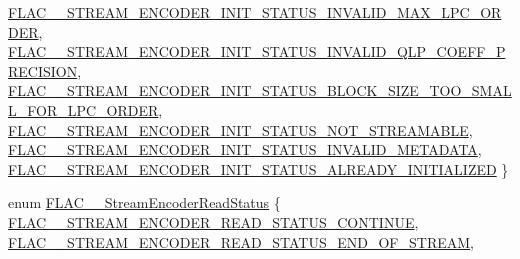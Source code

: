 \begin{DoxyCompactItemize}
\newline
\mbox{\hyperlink{group__flac__stream__encoder_gga3bb869620af2b188d77982a5c30b047da38a69e94b3333e4ba779d2ff8f43f64e}{F\+L\+A\+C\+\_\+\+\_\+\+S\+T\+R\+E\+A\+M\+\_\+\+E\+N\+C\+O\+D\+E\+R\+\_\+\+I\+N\+I\+T\+\_\+\+S\+T\+A\+T\+U\+S\+\_\+\+I\+N\+V\+A\+L\+I\+D\+\_\+\+M\+A\+X\+\_\+\+L\+P\+C\+\_\+\+O\+R\+D\+ER}}, 
\mbox{\hyperlink{group__flac__stream__encoder_gga3bb869620af2b188d77982a5c30b047da5be80403bd7a43450139442e0f34ad7e}{F\+L\+A\+C\+\_\+\+\_\+\+S\+T\+R\+E\+A\+M\+\_\+\+E\+N\+C\+O\+D\+E\+R\+\_\+\+I\+N\+I\+T\+\_\+\+S\+T\+A\+T\+U\+S\+\_\+\+I\+N\+V\+A\+L\+I\+D\+\_\+\+Q\+L\+P\+\_\+\+C\+O\+E\+F\+F\+\_\+\+P\+R\+E\+C\+I\+S\+I\+ON}}, 
\mbox{\hyperlink{group__flac__stream__encoder_gga3bb869620af2b188d77982a5c30b047da62a17a3ed3c05ddf8ea7f6fecbd4e4a1}{F\+L\+A\+C\+\_\+\+\_\+\+S\+T\+R\+E\+A\+M\+\_\+\+E\+N\+C\+O\+D\+E\+R\+\_\+\+I\+N\+I\+T\+\_\+\+S\+T\+A\+T\+U\+S\+\_\+\+B\+L\+O\+C\+K\+\_\+\+S\+I\+Z\+E\+\_\+\+T\+O\+O\+\_\+\+S\+M\+A\+L\+L\+\_\+\+F\+O\+R\+\_\+\+L\+P\+C\+\_\+\+O\+R\+D\+ER}}, 
\mbox{\hyperlink{group__flac__stream__encoder_gga3bb869620af2b188d77982a5c30b047daa793405c858c7606539082750080a47e}{F\+L\+A\+C\+\_\+\+\_\+\+S\+T\+R\+E\+A\+M\+\_\+\+E\+N\+C\+O\+D\+E\+R\+\_\+\+I\+N\+I\+T\+\_\+\+S\+T\+A\+T\+U\+S\+\_\+\+N\+O\+T\+\_\+\+S\+T\+R\+E\+A\+M\+A\+B\+LE}}, 
\newline
\mbox{\hyperlink{group__flac__stream__encoder_gga3bb869620af2b188d77982a5c30b047daa85afdd1849c75a19594416cef63e3e9}{F\+L\+A\+C\+\_\+\+\_\+\+S\+T\+R\+E\+A\+M\+\_\+\+E\+N\+C\+O\+D\+E\+R\+\_\+\+I\+N\+I\+T\+\_\+\+S\+T\+A\+T\+U\+S\+\_\+\+I\+N\+V\+A\+L\+I\+D\+\_\+\+M\+E\+T\+A\+D\+A\+TA}}, 
\mbox{\hyperlink{group__flac__stream__encoder_gga3bb869620af2b188d77982a5c30b047dab4e7b50d176a127575df90383cb15e1d}{F\+L\+A\+C\+\_\+\+\_\+\+S\+T\+R\+E\+A\+M\+\_\+\+E\+N\+C\+O\+D\+E\+R\+\_\+\+I\+N\+I\+T\+\_\+\+S\+T\+A\+T\+U\+S\+\_\+\+A\+L\+R\+E\+A\+D\+Y\+\_\+\+I\+N\+I\+T\+I\+A\+L\+I\+Z\+ED}}
 \}
\item 
enum \mbox{\hyperlink{group__flac__stream__encoder_ga2e81f007fb0a7414c0bbb453f37ea37f}{F\+L\+A\+C\+\_\+\+\_\+\+Stream\+Encoder\+Read\+Status}} \{ \mbox{\hyperlink{group__flac__stream__encoder_gga2e81f007fb0a7414c0bbb453f37ea37fa4bdd691d3666f19ec96ff99402347a2e}{F\+L\+A\+C\+\_\+\+\_\+\+S\+T\+R\+E\+A\+M\+\_\+\+E\+N\+C\+O\+D\+E\+R\+\_\+\+R\+E\+A\+D\+\_\+\+S\+T\+A\+T\+U\+S\+\_\+\+C\+O\+N\+T\+I\+N\+UE}}, 
\mbox{\hyperlink{group__flac__stream__encoder_gga2e81f007fb0a7414c0bbb453f37ea37fa562fef84bf86a9a39682e23066d9cfee}{F\+L\+A\+C\+\_\+\+\_\+\+S\+T\+R\+E\+A\+M\+\_\+\+E\+N\+C\+O\+D\+E\+R\+\_\+\+R\+E\+A\+D\+\_\+\+S\+T\+A\+T\+U\+S\+\_\+\+E\+N\+D\+\_\+\+O\+F\+\_\+\+S\+T\+R\+E\+AM}}, 

\end{DoxyCompactItemize}
